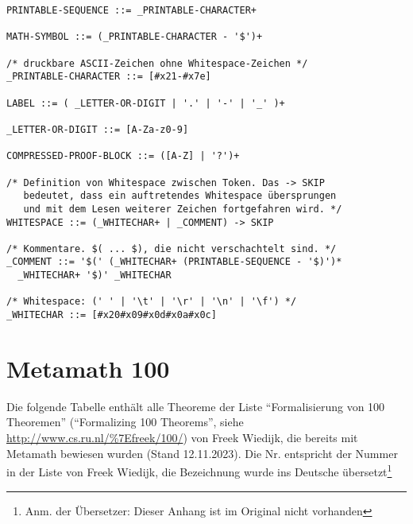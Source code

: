 \begin{verbatim}
PRINTABLE-SEQUENCE ::= _PRINTABLE-CHARACTER+

MATH-SYMBOL ::= (_PRINTABLE-CHARACTER - '$')+

/* druckbare ASCII-Zeichen ohne Whitespace-Zeichen */
_PRINTABLE-CHARACTER ::= [#x21-#x7e]

LABEL ::= ( _LETTER-OR-DIGIT | '.' | '-' | '_' )+

_LETTER-OR-DIGIT ::= [A-Za-z0-9]

COMPRESSED-PROOF-BLOCK ::= ([A-Z] | '?')+

/* Definition von Whitespace zwischen Token. Das -> SKIP
   bedeutet, dass ein auftretendes Whitespace übersprungen
   und mit dem Lesen weiterer Zeichen fortgefahren wird. */
WHITESPACE ::= (_WHITECHAR+ | _COMMENT) -> SKIP

/* Kommentare. $( ... $), die nicht verschachtelt sind. */
_COMMENT ::= '$(' (_WHITECHAR+ (PRINTABLE-SEQUENCE - '$)')*
  _WHITECHAR+ '$)' _WHITECHAR

/* Whitespace: (' ' | '\t' | '\r' | '\n' | '\f') */
_WHITECHAR ::= [#x20#x09#x0d#x0a#x0c]
\end{verbatim}
%

\chapter{Metamath 100}%
\label{Metamath100}%

Die folgende Tabelle enthält alle Theoreme der Liste 
"`Formalisierung von 100 Theoremen"' ("`Formalizing 100 Theorems"', siehe \url{http://www.cs.ru.nl/\%7Efreek/100/}) von Freek Wiedijk, die bereits mit Metamath bewiesen wurden (Stand 12.11.2023). Die Nr. entspricht der Nummer in der Liste von Freek Wiedijk, die Bezeichnung wurde ins Deutsche übersetzt\footnote{Anm. der Übersetzer: Dieser Anhang ist im Original nicht vorhanden}

